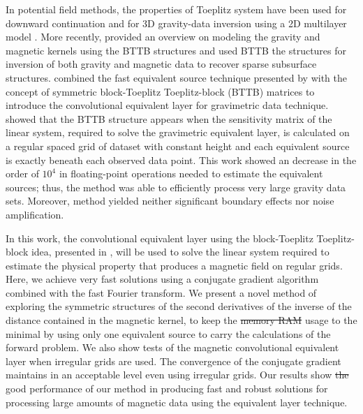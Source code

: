 \documentclass[manuscript]{geophysics}
\providecommand{\DIFaddtex}[1]{{\protect\color{blue}\uwave{#1}}} %
\providecommand{\DIFdeltex}[1]{{\protect\color{red}\sout{#1}}}                      %
\providecommand{\DIFaddbegin}{} %
\providecommand{\DIFaddend}{} %
\providecommand{\DIFdelbegin}{} %
\providecommand{\DIFdelend}{} %
\providecommand{\DIFadd}[1]{\texorpdfstring{\DIFaddtex{#1}}{#1}} %
\providecommand{\DIFdel}[1]{\texorpdfstring{\DIFdeltex{#1}}{}} %
\begin{document}
In potential field methods, the properties of Toeplitz system have been used for downward continuation \citep{zhang-etal2016} and for 3D gravity-data inversion using a 2D multilayer model \citep{zhang-wong2015}. More recently, \cite{hogue2020tutorial} provided an overview on modeling the gravity and magnetic kernels using the BTTB structures and \cite{renaut2020fast} used BTTB the structures for inversion of both gravity and magnetic data to recover sparse subsurface structures.
\cite{takahashi2020convolutional} combined the fast equivalent source technique presented by \cite{siqueira-etal2017} with the concept of symmetric block-Toeplitz Toeplitz-block (BTTB) matrices to introduce the convolutional equivalent layer for gravimetric data technique. 
\cite{takahashi2020convolutional} showed that the BTTB structure appears when the sensitivity matrix of the linear system, required to solve the gravimetric equivalent layer, is calculated on a regular spaced grid of dataset with constant height and each equivalent source is exactly beneath each observed data point. 
This work showed an decrease in the order of $10^4$ in floating-point operations needed to estimate the equivalent sources; thus, the \cite{takahashi2020convolutional} method was able to efficiently process very large gravity data sets. 
Moreover, \cite{takahashi2020convolutional} method yielded neither significant boundary effects nor noise amplification.

In this work, the convolutional equivalent layer using the block-Toeplitz Toeplitz-block idea, presented in \cite{takahashi2020convolutional}, will be used to solve the linear system required to estimate the physical property that produces a magnetic field on regular grids. 
Here, we achieve very fast solutions using a conjugate gradient algorithm combined with the fast Fourier transform. We present a novel method of exploring the symmetric structures of the second \DIFaddbegin \DIFadd{order }\DIFaddend derivatives of the inverse of the distance contained in the magnetic kernel, to keep the \DIFdelbegin \DIFdel{memory RAM }\DIFdelend \DIFaddbegin \DIFadd{computer memory }\DIFaddend usage to the minimal by using only one equivalent source to carry the calculations of the forward problem. We also show tests of the magnetic convolutional equivalent layer when irregular grids are used. The convergence of the conjugate gradient maintains in an acceptable level even using irregular grids. 
Our results show \DIFdelbegin \DIFdel{the }\DIFdelend \DIFaddbegin \DIFadd{a }\DIFaddend good performance of our method in producing fast and robust solutions for processing large amounts of magnetic data using the equivalent layer technique.
\end{document}
